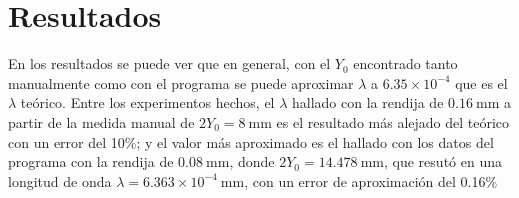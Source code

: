 \section{Resultados}
En los resultados se puede ver que en general, con el $Y_0$ encontrado
tanto manualmente como con el programa se puede aproximar
$\lambda$ a $6.35 \times 10^{-4}$ que es el $\lambda$ teórico. Entre
los experimentos hechos, el $\lambda$ hallado con la rendija de
$\SI{0.16}{\mm}$ a partir de la medida manual de $2Y_0 = \SI{8}{\mm}$
es el resultado más alejado del teórico con un error del 10\%; y el
valor más aproximado es el hallado con los datos del programa con la
rendija de $\SI{0.08}{\mm}$, donde $2Y_0 = \SI{14.478}{\mm}$, que
resutó en una longitud de onda
$\lambda = 6.363 \times 10^{-4}\ \si{\mm}$, con un error de
aproximación del 0.16\%